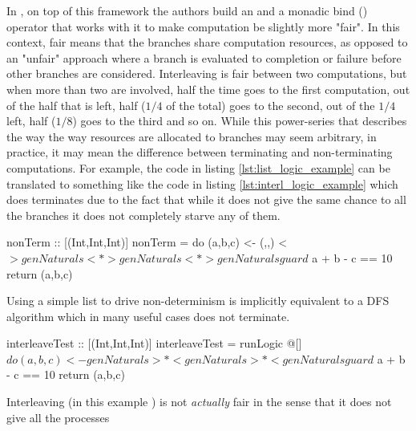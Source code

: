 In \cite{kiselyovBacktrackingInterleavingTerminating}, on top of this
framework the authors build an  and a monadic bind
(\hask{>>-}) operator that works with it to make computation be
slightly more "fair". In this context, fair means that the
branches share computation resources, as opposed to an "unfair" approach where a branch is evaluated to 
completion or failure before other branches are considered. Interleaving is 
fair between two computations, but when more than two
are involved, half the time goes to the first computation, out of the
half that is left, half (\(1/4\) of the total) goes to the second, out
of the \(1/4\) left, half (\(1/8\)) goes to the third and so on. While
this power-series that describes the way the way resources are
allocated to branches may seem arbitrary, in practice, it may mean the
difference between terminating and non-terminating computations. For
example, the code in listing \ref{lst:list_logic_example} can be
translated to something like the code in listing
\ref{lst:interl_logic_example} which does terminates due to the fact
that while it does not give the same chance to all the branches it
does not completely starve any of them.

\begin{code}
\begin{haskellcode}
nonTerm :: [(Int,Int,Int)]
nonTerm = do
  (a,b,c) <- (,,) <$> genNaturals <*> genNaturals <*> genNaturals
  guard $ a + b - c == 10
  return (a,b,c)
\end{haskellcode}
  \caption{\label{lst:list_logic_example}Using a simple list to drive
    non-determinism is implicitly equivalent to a DFS algorithm which
    in many useful cases does not terminate.}
\end{code}

\begin{code}
\begin{haskellcode}
interleaveTest :: [(Int,Int,Int)]
interleaveTest = runLogic @[] $ do
  (a,b,c) <- genNaturals >*< genNaturals >*< genNaturals
  guard $ a + b - c == 10
  return (a,b,c)
\end{haskellcode}
  \caption{\label{lst:interl_logic_example}Interleaving (in this
    example \hask{>*<}) is not \emph{actually} fair in the sense that
    it does not give all the processes}
\end{code}

